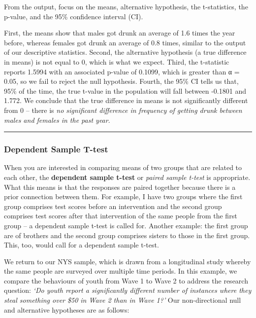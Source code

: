 \documentclass[
]{book}
\begin{document}
From the output, focus on the means, alternative hypothesis, the t-statistics, the p-value, and the 95\% confidence interval (CI).

First, the means show that males got drunk an average of 1.6 times the year before, whereas females got drunk an average of 0.8 times, similar to the output of our descriptive statistics. Second, the alternative hypothesis (a true difference in means) is not equal to 0, which is what we expect. Third, the t-statistic reports 1.5994 with an associated p-value of 0.1099, which is greater than α = 0.05, so we fail to reject the null hypothesis. Fourth, the 95\% CI tells us that, 95\% of the time, the true t-value in the population will fall between -0.1801 and 1.772. We conclude that the true difference in means is not significantly different from 0 -- there is \emph{no significant difference in frequency of getting drunk between males and females in the past year}.

\begin{center}\rule{0.5\linewidth}{0.5pt}\end{center}

\hypertarget{dependent-sample-t-test}{%
\subsubsection{Dependent Sample T-test}\label{dependent-sample-t-test}}

When you are interested in comparing means of two groups that are related to each other, the \textbf{dependent sample t-test} or \emph{paired sample t-test} is appropriate. What this means is that the responses are paired together because there is a prior connection between them. For example, I have two groups where the first group comprises test scores before an intervention and the second group comprises test scores after that intervention of the same people from the first group -- a dependent sample t-test is called for. Another example: the first group are of brothers and the second group comprises sisters to those in the first group. This, too, would call for a dependent sample t-test.

We return to our NYS sample, which is drawn from a longitudinal study whereby the same people are surveyed over multiple time periods. In this example, we compare the behaviours of youth from Wave 1 to Wave 2 to address the research question: \emph{`Do youth report a significantly different number of instances where they steal something over \$50 in Wave 2 than in Wave 1?'} Our non-directional null and alternative hypotheses are as follows:
\end{document}
